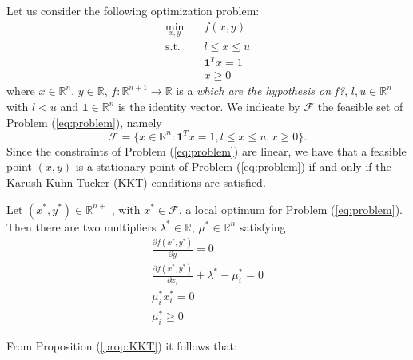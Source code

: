 Let us consider the following optimization problem:
\begin{subequations}\label{eq:problem} 
\begin{align}
\min_{x,y} & \quad f(x,y)  \\
\text{s.t.} & \quad l \leq x \leq u \\
& \quad \mathbf{1}^T x = 1 \\
& \quad x \geq 0
\end{align}
\end{subequations}
where $x \in \mathbb{R}^n$, $y \in \mathbb{R}$, $f:\mathbb{R}^{n+1} \rightarrow \mathbb{R}$ is a \textit{which are the hypothesis on f?}, $l, u \in \mathbb{R}^n$ with $l < u$ and $\mathbf{1} \in \mathbb{R}^n$ is the identity vector. We indicate by $\mathcal{F}$ the feasible set of Problem (\ref{eq:problem}), namely
\begin{equation}
\mathcal{F} = \{x \in \mathbb{R}^n : \mathbf{1}^T x = 1, l \leq x \leq u, x \geq 0 \}.
\end{equation}
Since the constraints of Problem (\ref{eq:problem}) are linear, we have that a feasible point $(x,y)$ is a stationary point of Problem (\ref{eq:problem}) if and only if the Karush-Kuhn-Tucker (KKT) conditions are satisfied.

\begin{proposition}\label{prop:KKT}
Let $(x^*,y^*) \in \mathbb{R}^{n+1}$, with $x^* \in \mathcal{F}$, a local optimum for Problem (\ref{eq:problem}). Then there are two multipliers $\lambda^* \in \mathbb{R}$, $\mu^* \in \mathbb{R}^n$ satisfying
\begin{subequations}
\begin{align}
\frac{\partial f(x^*, y^*)}{\partial y} = 0 \\
\frac{\partial f(x^*, y^*)}{\partial x_i} +\lambda^* - \mu^*_i =0 \\
\mu^*_ix^{*}_i=0 \\
\mu^*_i\ge0
\end{align}
\end{subequations}
\end{proposition}

\hspace{-1.8em} From Proposition (\ref{prop:KKT}) it follows that:

